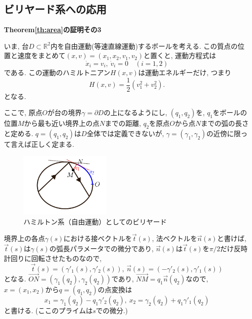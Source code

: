 \documentclass[a4paper]{ujarticle}
\makeatletter
\numberwithin{equation}{section}
\theoremstyle{definition}
\renewenvironment{proof}[1][Proof]{\par
  \pushQED{\qed}%
  \normalfont \topsep6\p@\@plus6\p@\relax
  \trivlist
  \item\relax
  {\bfseries
  #1\@addpunct{.}}\hspace\labelsep\ignorespaces
}{%
  \popQED\endtrivlist\@endpefalse
}
\makeatother
\begin{document}
    \subsection{ビリヤード系への応用}
        \begin{proof}[Theorem\ref{th:area}の証明その3]
            いま, 台$D \subset \mathbb{R}^2$内を自由運動(等速直線運動)するボールを考える.
            この質点の位置と速度をまとめて$(x, v) = (x_1, x_2, v_1, v_2)$と置くと, 運動方程式は
            \[
                \dot{x}_i = v_{i}, \ \dot{v}_i = 0 \quad (i = 1, 2)
            \]  
            である. この運動のハミルトニアン$H(x, v)$は運動エネルギーだけ, つまり
            \[
                H(x, v) = \frac{1}{2} (v_1^2 + v_2^2).
            \]
            となる.

            ここで, 原点$O$が台の境界$\gamma = \partial D$の上になるようにし, 
            $(q_1, q_2)$を, 
            $q_1$をボールの位置$M$から最も近い境界上の点$N$までの距離,
            $q_2$を原点$O$から点$N$までの弧の長さ
            と定める.
            $q = (q_1, q_2)$は$D$全体では定義できないが,
            $\gamma = (\gamma_1, \gamma_2)$の近傍に限って言えば正しく定まる.

            \begin{figure}[h]
                \centering
                \includegraphics[width = 0.4\textwidth]{billiard_Hamilton.png}
                \caption{ハミルトン系（自由運動）としてのビリヤード}
            \end{figure}

            境界上の各点$\gamma(s)$における接ベクトルを$\vec{t}(s)$,
            法ベクトルを$\vec{n}(s)$と書けば,
            $\vec{t}(s)$は$\gamma(s)$の弧長パラメータでの微分であり,
            $\vec{n}(s)$は$\vec{t}(s)$を$\pi/2$だけ反時計回りに回転させたものなので,
            \[
                \vec{t}(s) = (\gamma'_1(s), \gamma'_2(s)), \ \vec{n}(s) = (- \gamma'_2(s), \gamma'_1(s))
            \]
            となる.
            $\vec{ON} = (\gamma_1(q_2), \gamma_2(q_2))$であり,
            $\vec{NM} = q_1 \vec{n}(q_2)$なので,
            $x = (x_1, x_2)$から$q = (q_1, q_2)$の点変換は
            \[
                x_1 = \gamma_1(q_2) - q_1 \gamma'_2(q_2), \ x_2 = \gamma_2(q_2) + q_1 \gamma'_1(q_2)
            \]  
            と書ける. (ここのプライムは$s$での微分.)


\end{proof}
\end{document}
